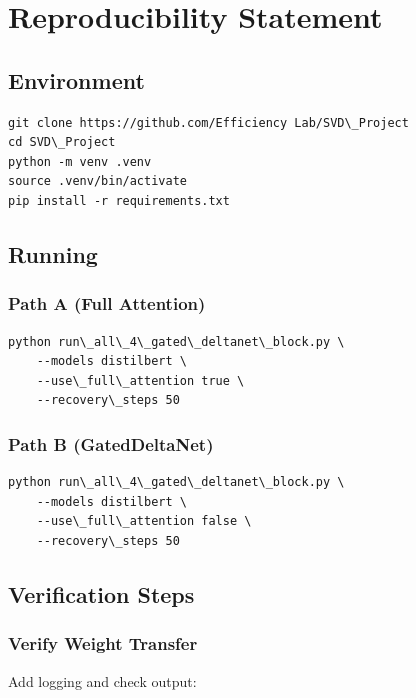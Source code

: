 
\section{Reproducibility Statement}

\subsection{Environment}

\begin{lstlisting}
git clone https://github.com/Efficiency Lab/SVD\_Project
cd SVD\_Project
python -m venv .venv
source .venv/bin/activate
pip install -r requirements.txt
\end{lstlisting}

\subsection{Running}

\subsubsection{Path A (Full Attention)}

\begin{lstlisting}
python run\_all\_4\_gated\_deltanet\_block.py \
    --models distilbert \
    --use\_full\_attention true \
    --recovery\_steps 50
\end{lstlisting}

\subsubsection{Path B (GatedDeltaNet)}

\begin{lstlisting}
python run\_all\_4\_gated\_deltanet\_block.py \
    --models distilbert \
    --use\_full\_attention false \
    --recovery\_steps 50
\end{lstlisting}

\subsection{Verification Steps}

\subsubsection{Verify Weight Transfer}

Add logging and check output:

